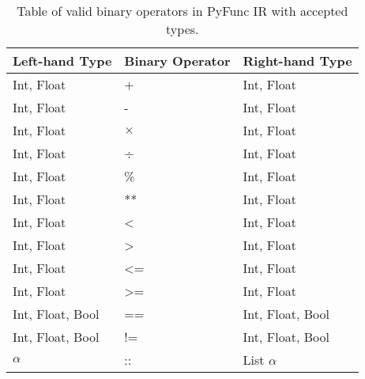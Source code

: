 \documentclass{l4proj}
\begin{document}
\begin{table}[]
    \begin{center}
        \begin{tabular}{|lll|}
            \hline
            Left-hand Type   & Binary Operator & Right-hand Type  \\ \hline
            Int, Float       & +               & Int, Float       \\
            Int, Float       & -               & Int, Float       \\
            Int, Float       & $\times$        & Int, Float       \\
            Int, Float       & ÷       & Int, Float       \\
            Int, Float       & \%              & Int, Float       \\
            Int, Float       & **              & Int, Float       \\
            Int, Float       & \textless{}     & Int, Float       \\
            Int, Float       & \textgreater{}  & Int, Float       \\
            Int, Float       & <=    & Int, Float       \\
            Int, Float       & >= & Int, Float       \\
            Int, Float, Bool & ==              & Int, Float, Bool \\
            Int, Float, Bool & !=              & Int, Float, Bool \\
            $\alpha$         & ::              & List $\alpha$    \\ \hline
        \end{tabular}
        \caption{Table of valid binary operators in PyFunc IR with accepted types.}
    \end{center}
\end{table}
\end{document}

